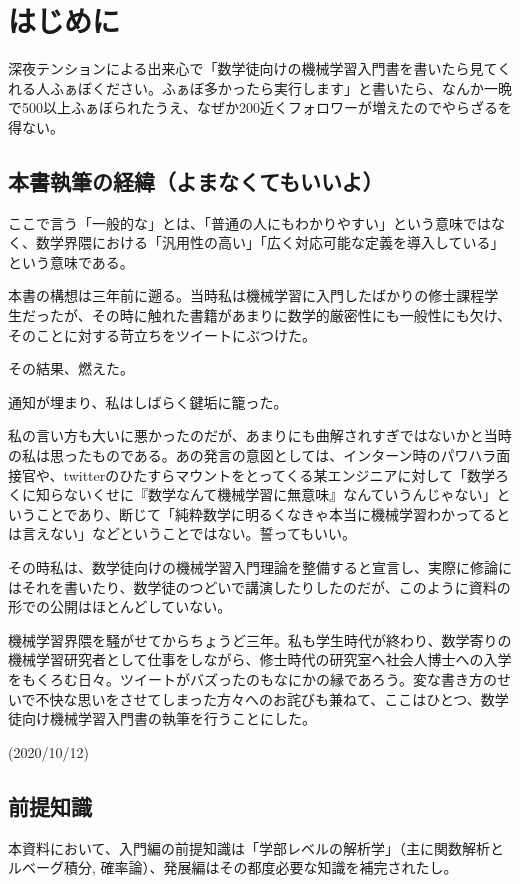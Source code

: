 \documentclass{jsarticle}
\begin{document}
\newpage
\section{はじめに}

深夜テンションによる出来心で「数学徒向けの機械学習入門書を書いたら見てくれる人ふぁぼください。ふぁぼ多かったら実行します」と書いたら、なんか一晩で500以上ふぁぼられたうえ、なぜか200近くフォロワーが増えたのでやらざるを得ない。

\subsection{本書執筆の経緯（よまなくてもいいよ）}

ここで言う「一般的な」とは、「普通の人にもわかりやすい」という意味ではなく、数学界隈における「汎用性の高い」「広く対応可能な定義を導入している」という意味である。

本書の構想は三年前に遡る。当時私は機械学習に入門したばかりの修士課程学生だったが、その時に触れた書籍があまりに数学的厳密性にも一般性にも欠け、そのことに対する苛立ちをツイートにぶつけた。

その結果、燃えた。

通知が埋まり、私はしばらく鍵垢に籠った。

私の言い方も大いに悪かったのだが、あまりにも曲解されすぎではないかと当時の私は思ったものである。あの発言の意図としては、インターン時のパワハラ面接官や、twitterのひたすらマウントをとってくる某エンジニアに対して「数学ろくに知らないくせに『数学なんて機械学習に無意味』なんていうんじゃない」ということであり、断じて「純粋数学に明るくなきゃ本当に機械学習わかってるとは言えない」などということではない。誓ってもいい。

その時私は、数学徒向けの機械学習入門理論を整備すると宣言し、実際に修論にはそれを書いたり、数学徒のつどいで講演したりしたのだが、このように資料の形での公開はほとんどしていない。

機械学習界隈を騒がせてからちょうど三年。私も学生時代が終わり、数学寄りの機械学習研究者として仕事をしながら、修士時代の研究室へ社会人博士への入学をもくろむ日々。ツイートがバズったのもなにかの縁であろう。変な書き方のせいで不快な思いをさせてしまった方々へのお詫びも兼ねて、ここはひとつ、数学徒向け機械学習入門書の執筆を行うことにした。

(2020/10/12)

\subsection{前提知識}
本資料において、入門編の前提知識は「学部レベルの解析学」（主に関数解析とルベーグ積分,
確率論）、発展編はその都度必要な知識を補完されたし。
\end{document}
